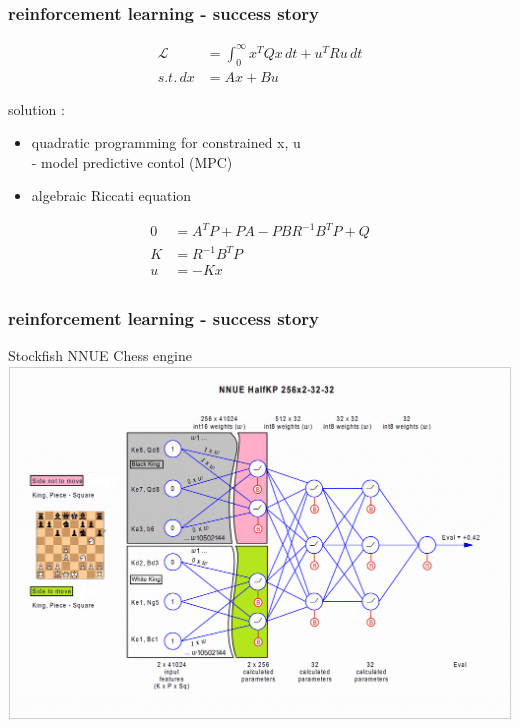 \documentclass{beamer}
\begin{document}
\begin{frame}
  \frametitle{reinforcement learning - success story}


  \begin{align*}
    \mathcal{L} &= \int_{0}^{\infty} x^TQx\,dt + u^TRu\,dt \\
    s.t.\, dx &= Ax + Bu
  \end{align*}

  solution :
  \begin{itemize}
    \item quadratic programming for constrained x, u \\ - model predictive contol (MPC)
    \item algebraic Riccati equation
  \end{itemize}

  \begin{align*}
    0 &= A^TP + PA - PBR^{-1}B^TP + Q \\
    K &= R^{-1} B^T P\\
    u &= -Kx \\
  \end{align*}
    
\end{frame}


\begin{frame}
  \frametitle{reinforcement learning - success story}
  Stockfish NNUE Chess engine \\
  \centering
  \includegraphics[scale=0.18]{../images/nnue.png}
    
\end{frame}
\end{document}
